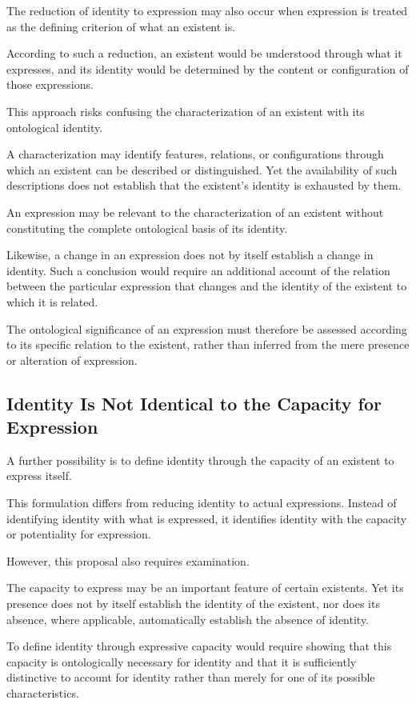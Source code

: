 The reduction of identity to expression may also occur
when expression is treated as the defining criterion
of what an existent is.

According to such a reduction, an existent would be
understood through what it expresses, and its identity
would be determined by the content or configuration
of those expressions.

This approach risks confusing the characterization
of an existent with its ontological identity.

A characterization may identify features, relations,
or configurations through which an existent can be
described or distinguished. Yet the availability of
such descriptions does not establish that the existent's
identity is exhausted by them.

An expression may be relevant to the characterization
of an existent without constituting the complete
ontological basis of its identity.

Likewise, a change in an expression does not by itself
establish a change in identity. Such a conclusion would
require an additional account of the relation between
the particular expression that changes and the identity
of the existent to which it is related.

The ontological significance of an expression must
therefore be assessed according to its specific relation
to the existent, rather than inferred from the mere
presence or alteration of expression.

\subsection{Identity Is Not Identical to the Capacity for Expression}

A further possibility is to define identity through
the capacity of an existent to express itself.

This formulation differs from reducing identity to
actual expressions. Instead of identifying identity
with what is expressed, it identifies identity with
the capacity or potentiality for expression.

However, this proposal also requires examination.

The capacity to express may be an important feature
of certain existents. Yet its presence does not by itself
establish the identity of the existent, nor does its
absence, where applicable, automatically establish
the absence of identity.

To define identity through expressive capacity would
require showing that this capacity is ontologically
necessary for identity and that it is sufficiently
distinctive to account for identity rather than merely
for one of its possible characteristics.

